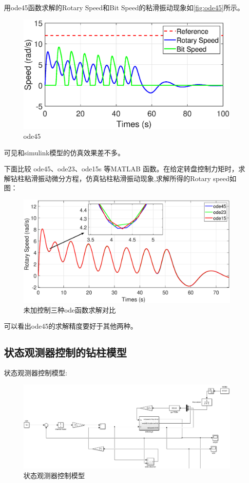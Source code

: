 \documentclass[12pt,hyperref,a4paper,UTF8]{ctexart}
\begin{document}
	\newpage
	用ode45函数求解的Rotary Speed和Bit Speed的粘滑振动现象如\autoref{fig:ode45}所示。
	
	\begin{figure}[!htbp]
		\centering
		\includegraphics[width=0.7\linewidth]{figures/ode45}
		\caption{ode45}
		\label{fig:ode45}
	\end{figure}
	
	可见和simulink模型的仿真效果差不多。
	
	下面比较 ode45、ode23、ode15s 等MATLAB 函数。在给定转盘控制力矩时，求解钻柱粘滑振动微分方程，仿真钻柱粘滑振动现象,求解所得的Rotary speed如图：
	
	\begin{figure}[!htbp]
		\centering
		\includegraphics[width=0.8\linewidth]{figures/未加控制三种ode函数求解对比}
		\caption{未加控制三种ode函数求解对比}
		\label{fig:未加控制三种ode函数求解对比}
	\end{figure}
	
	
	可以看出ode45的求解精度要好于其他两种。
	
	\newpage
	\subsection{状态观测器控制的钻柱模型}
	
	状态观测器控制模型:
	
	\begin{figure}[!htbp]
		\centering
		\includegraphics[width=0.7\linewidth]{figures/状态观测器控制}
		\caption{状态观测器控制模型}
		\label{fig:状态观测器控制模型}
	\end{figure}
	
\end{document}
